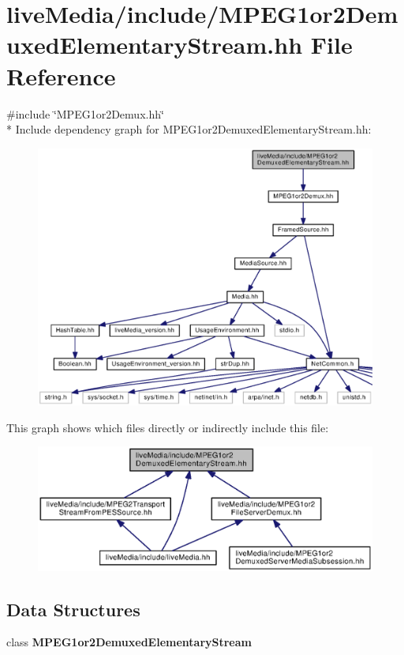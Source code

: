 \section{live\+Media/include/\+M\+P\+E\+G1or2\+Demuxed\+Elementary\+Stream.hh File Reference}
\label{MPEG1or2DemuxedElementaryStream_8hh}
{\ttfamily \#include \char`\"{}M\+P\+E\+G1or2\+Demux.\+hh\char`\"{}}\\*
Include dependency graph for M\+P\+E\+G1or2\+Demuxed\+Elementary\+Stream.\+hh\+:
\nopagebreak
\begin{figure}[H]
\begin{center}
\leavevmode
\includegraphics[width=350pt]{MPEG1or2DemuxedElementaryStream_8hh__incl}
\end{center}
\end{figure}
This graph shows which files directly or indirectly include this file\+:
\nopagebreak
\begin{figure}[H]
\begin{center}
\leavevmode
\includegraphics[width=350pt]{MPEG1or2DemuxedElementaryStream_8hh__dep__incl}
\end{center}
\end{figure}
\subsection*{Data Structures}
\begin{DoxyCompactItemize}
\item 
class {\bf M\+P\+E\+G1or2\+Demuxed\+Elementary\+Stream}
\end{DoxyCompactItemize}
